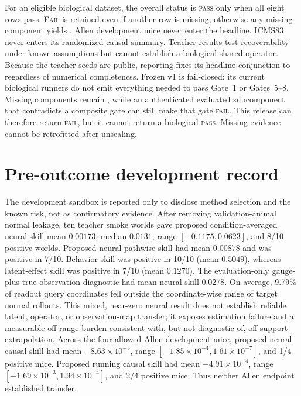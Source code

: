 \documentclass[11pt]{article}
\begin{document}
For an eligible biological dataset, the overall status is \textsc{pass} only
when all eight rows pass.
\textsc{Fail} is retained even if another row is missing; otherwise any missing
component yields \NotEvaluated{}. Allen development mice never enter the
headline. ICMS83 never enters its randomized causal summary. Teacher results
test recoverability under known assumptions but cannot establish a biological
shared operator. Because the teacher seeds are public, reporting fixes its
headline conjunction to \NotEvaluated{} regardless of numerical completeness.
Frozen v1 is fail-closed: its current biological runners do not emit everything
needed to pass Gate~1 or Gates~5--8. Missing components remain
\NotEvaluated{}, while an authenticated evaluated subcomponent that
contradicts a composite gate can still make that gate \textsc{fail}. This
release can therefore return \textsc{fail}, but it cannot return a biological
\textsc{pass}. Missing evidence cannot be retrofitted after unsealing.

\section{Pre-outcome development record}

The development sandbox is reported only to disclose method selection and the
known risk, not as confirmatory evidence. After removing validation-animal
normal leakage, ten teacher smoke worlds gave proposed condition-averaged
neural skill mean \(0.00173\), median \(0.0131\), range
\([-0.1175,0.0623]\), and 8/10 positive worlds. Proposed neural pathwise skill
had mean \(0.00878\) and was positive in 7/10. Behavior skill was positive in
10/10 (mean \(0.5049\)), whereas latent-effect skill was positive in 7/10
(mean \(0.1270\)). The evaluation-only gauge-plus-true-observation diagnostic
had mean neural skill \(0.0278\). On average, 9.79\% of readout query
coordinates fell outside the coordinate-wise range of target normal
rollouts. This mixed, near-zero neural result does not establish reliable
latent, operator, or observation-map transfer; it exposes estimation failure
and a measurable off-range burden consistent with, but not diagnostic of,
off-support extrapolation. Across the four allowed Allen development mice,
proposed neural causal skill had mean \(-8.63\times10^{-5}\), range
\([-1.85\times10^{-4},1.61\times10^{-7}]\), and 1/4 positive mice.
Proposed running causal skill had mean \(-4.91\times10^{-4}\), range
\([-1.69\times10^{-3},1.94\times10^{-4}]\), and 2/4 positive mice.
Thus neither Allen endpoint established transfer.
\end{document}

